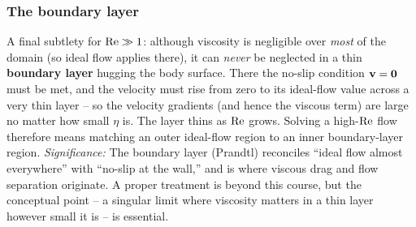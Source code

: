 \documentclass[../main.tex]{subfiles}
\begin{document}
\subsubsection*{The boundary layer}
A final subtlety for $\mathrm{Re}\gg1$: although viscosity is negligible over \emph{most} of the domain (so ideal flow applies there), it can \emph{never} be neglected in a thin \textbf{boundary layer} hugging the body surface. There the no-slip condition $\mathbf{v}=\mathbf{0}$ must be met, and the velocity must rise from zero to its ideal-flow value across a very thin layer -- so the velocity gradients (and hence the viscous term) are large no matter how small $\eta$ is. The layer thins as $\mathrm{Re}$ grows. Solving a high-$\mathrm{Re}$ flow therefore means matching an outer ideal-flow region to an inner boundary-layer region.
\textit{Significance:} The boundary layer (Prandtl) reconciles ``ideal flow almost everywhere'' with ``no-slip at the wall,'' and is where viscous drag and flow separation originate. A proper treatment is beyond this course, but the conceptual point -- a singular limit where viscosity matters in a thin layer however small it is -- is essential.


\end{document}
